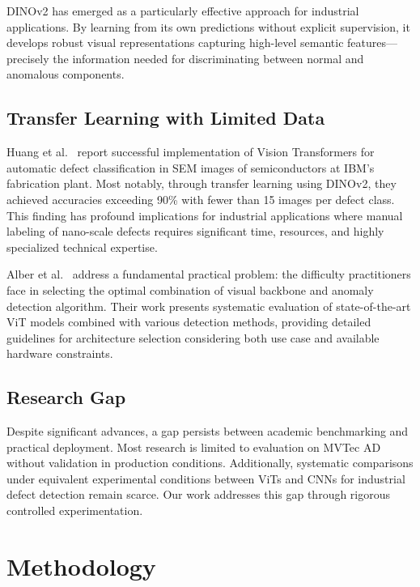 \documentclass[journal,twoside,web]{ieeecolor}
\begin{document}
DINOv2 has emerged as a particularly effective approach for industrial applications. By learning from its own predictions without explicit supervision, it develops robust visual representations capturing high-level semantic features---precisely the information needed for discriminating between normal and anomalous components.

\subsection{Transfer Learning with Limited Data}

Huang et al.~\cite{huang2025semiconductor} report successful implementation of Vision Transformers for automatic defect classification in SEM images of semiconductors at IBM's fabrication plant. Most notably, through transfer learning using DINOv2, they achieved accuracies exceeding 90\% with fewer than 15 images per defect class. This finding has profound implications for industrial applications where manual labeling of nano-scale defects requires significant time, resources, and highly specialized technical expertise.

Alber et al.~\cite{alber2024evaluating} address a fundamental practical problem: the difficulty practitioners face in selecting the optimal combination of visual backbone and anomaly detection algorithm. Their work presents systematic evaluation of state-of-the-art ViT models combined with various detection methods, providing detailed guidelines for architecture selection considering both use case and available hardware constraints.

\subsection{Research Gap}

Despite significant advances, a gap persists between academic benchmarking and practical deployment. Most research is limited to evaluation on MVTec AD without validation in production conditions. Additionally, systematic comparisons under equivalent experimental conditions between ViTs and CNNs for industrial defect detection remain scarce. Our work addresses this gap through rigorous controlled experimentation.

\section{Methodology}
\label{sec:methodology}
\end{document}

